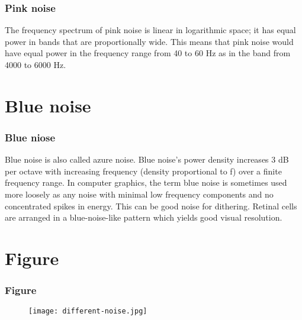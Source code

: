 \documentclass[12pt]{beamer}
\begin{document}
\begin{frame}
	\frametitle{Pink noise}
	\quad The frequency spectrum of pink noise is linear in logarithmic space; it has equal power in bands that are proportionally wide. This means that pink noise would have equal power in the frequency range from 40 to 60 Hz as in the band from 4000 to 6000 Hz.

\end{frame}

\section{Blue noise}
\begin{frame}
	\frametitle{Blue niose}
	\quad Blue noise is also called azure noise. Blue noise's power density increases 3 dB per octave with increasing frequency (density proportional to f) over a finite frequency range. In computer graphics, the term  blue noise is sometimes used more loosely as any noise with minimal low frequency components and no concentrated spikes in energy. This can be good noise for dithering. Retinal cells are arranged in a blue-noise-like pattern which yields good visual resolution.


\end{frame}

\section{Figure}
	\begin{frame}
		\frametitle{Figure}
\begin{figure}
  \centering
  \texttt{[image: different-noise.jpg]}\\\
 
\end{figure}
		
	\end{frame}
	
	
\end{document}
